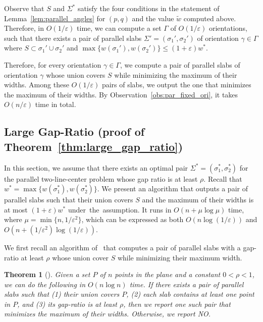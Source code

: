 \documentclass[10pt,a4paper]{article}
\newtheorem{theorem}{Theorem}
\theoremstyle{star}
\theoremstyle{claimstar}
\newcommand{\eps}{\ensuremath{\varepsilon}}
\begin{document}
Observe that $S$ and $\Sigma^*$ satisfy the four conditions in the statement of Lemma~\ref{lem:parallel_angles} for $(p, q)$ and the value $\widetilde w$ computed above.
Therefore, in $O(1/\eps)$ time, we can compute a set $\Gamma$ of $O(1/\eps)$ orientations, such that there exists a pair of parallel slabs $\Sigma' = (\sigma_1', \sigma_2')$  of orientation $\gamma \in \Gamma$ where $S\subset \sigma_1'\cup \sigma_2'$ and $\max \{w(\sigma_1'), w(\sigma_2') \} \le (1+\eps) w^*$.

Therefore, for every orientation $\gamma \in \Gamma$, we compute a pair of parallel slabs of orientation $\gamma$ whose union covers $S$ while minimizing the maximum of their widths. 
Among these $O(1/\eps)$ pairs of slabs, we output the one that minimizes the maximum of their widths.
By Observation~\ref{obs:par_fixed_ori}, it takes $O(n/\eps)$ time in total. 



\subsection{Large Gap-Ratio (proof of Theorem~\ref{thm:large_gap_ratio})}
\label{sec:large_gap_ratio}
In this section, we assume that there exists an optimal pair $\Sigma^* = (\sigma_1^*, \sigma_2^*)$ for the parallel two-line-center problem whose gap ratio is at least $\rho$. 
Recall that $w^* = \max \{w(\sigma_1^*), w(\sigma_2^*) \}$.
We present an algorithm that outputs a pair of parallel slabs such that their union covers $S$ and the maximum of their widths is at most $(1+\eps)w^*$ under~the~assumption. 
It runs in $O(n + \mu \log \mu)$ time, where $\mu = \min \{n, 1/\eps^2 \}$, which can be expressed as both $O(n \log (1/\eps))$ and $O(n + (1/\eps^2) \log (1/\eps))$. 

We first recall an algorithm of~\cite{chung2025parallel} that computes a pair of parallel slabs with a gap-ratio at least $\rho$ whose union cover $S$ while minimizing their maximum width.


\begin{theorem}
    [\cite{chung2025parallel}]
    \label{thm:large_gap_prev}
    Given a set $P$ of $n$ points in the plane and a constant $0< \rho < 1$, we can do the following in $O(n\log n)$ time. If there exists a pair of parallel slabs such that (1) their union covers $P$, (2) each slab contains at least one point in $P$, and (3) its gap-ratio is at least $\rho$, then we report one such pair that minimizes the maximum of their widths.
    Otherwise, we report NO.
\end{theorem}
\end{document}
